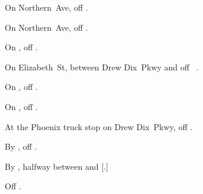 
\begin{LocationList}

On Northern~Ave, off  .

On Northern~Ave, off  .

On , off  .

On Elizabeth~St, between Drew Dix~Pkwy and  off~ .

On , off  .

On , off  .

At the Phoenix truck stop on Drew Dix~Pkwy, off  .

By , off  .

By , halfway between  and [.]

Off  .

\end{LocationList}
